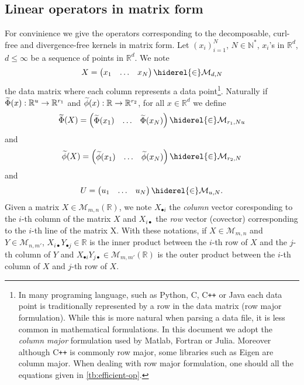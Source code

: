 \subsection{Linear operators in matrix form}
For convinience we give the operators corresponding to the decomposable, curl-free and divergence-free kernels in matrix form. Let $(x_i)_{i=1}^N$, $N\in\mathbb{N}^*$, $x_i$'s in $\mathbb{R}^d$, $d\le\infty$ be a sequence of points in $\mathbb{R}^d$. We note
\begin{dmath*}
X=\begin{pmatrix}x_1 & \hdots & x_N\end{pmatrix}\hiderel{\in}\mathcal{M}_{d,N}
\end{dmath*}
the data matrix where each column represents a data point\footnote{In many programing language, such as Python, C, C{}\verb!++! or Java each data point is traditionally represented by a row in the data matrix (row major formulation). While this is more natural when parsing a data file, it is less common in mathematical formulations. In this document we adopt the \emph{column major} formulation used by Matlab, Fortran or Julia. Moreover although C{}\verb!++! is commonly row major, some libraries such as Eigen are column major. When dealing with row major formulation, one should  all the equations given in \cref{tb:efficient-op}.}. Naturally if $\widetilde{\Phi}(x):\mathbb{R}^u\to\mathbb{R}^{r_1}$ and $\widetilde{\phi}(x):\mathbb{R}\to\mathbb{R}^{r_2}$, for all $x\in\mathbb{R}^d$ we define
\begin{dmath*}
\tildePhi{\omega}(X)=\begin{pmatrix}\tildePhi{\omega}(x_1) & \hdots & \tildePhi{\omega}(x_N)\end{pmatrix}\hiderel{\in}\mathcal{M}_{r_1,Nu}
\end{dmath*}
and
\begin{dmath*}
\tildephi{\omega}(X)=\begin{pmatrix}\tildephi{\omega}(x_1) & \hdots & \tildephi{\omega}(x_N)\end{pmatrix}\hiderel{\in}\mathcal{M}_{r_2, N}
\end{dmath*}
and
\begin{dmath*}
U=\begin{pmatrix} u_1 & \hdots&  u_N \end{pmatrix}\hiderel{\in}\mathcal{M}_{u, N}.
\end{dmath*}
Given a matrix $X\in\mathcal{M}_{m,n}(\mathbb{R})$, we note $X_{\bullet i}$ the \emph{column} vector coresponding to the $i$-th column of the matrix $X$ and $X_{i \bullet}$ the \emph{row} vector (covector) corresponding to the $i$-th line of the matrix X. With these notations, if $X\in\mathcal{M}_{m,n}$ and $Y\in\mathcal{M}_{n,m'}$, $X_{i\bullet}Y_{\bullet j}\in\mathbb{R}$ is the inner product between the $i$-th row of $X$ and the $j$-th column of $Y$ and $X_{\bullet i} Y_{j \bullet}\in\mathcal{M}_{m,m'}(\mathbb{R})$ is the outer product between the $i$-th column of $X$ and $j$-th row of $X$.
